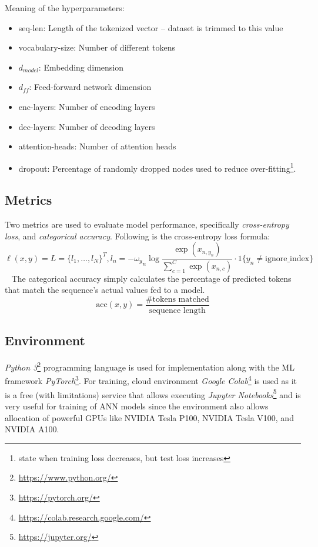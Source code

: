     {\parindent0pt %
Meaning of the hyperparameters:
}
\begin{itemize}
    \item seq-len: Length of the tokenized vector – dataset is trimmed to this value
    \item vocabulary-size: Number of different tokens
    \item $d_{model}$: Embedding dimension
    \item $d_{ff}$: Feed-forward network dimension
    \item enc-layers: Number of encoding layers
    \item dec-layers: Number of decoding layers
    \item attention-heads: Number of attention heads
    \item dropout: Percentage of randomly dropped nodes used to reduce over-fitting\footnote{state when training loss decreases, but test loss increases}.
\end{itemize}

\subsection{Metrics}\label{subsec:metrics}

Two metrics are used to evaluate model performance, specifically \textit{cross-entropy loss}, and \textit{categorical accuracy}.
Following is the cross-entropy loss formula:
\[
    \ell (x, y) = L = \{l_1, \ldots, l_N\}^T, l_n = - {\omega_y}_{n} \log \frac{\exp (x_{n,y_n})}{\sum_{c=1}^{C} \exp (x_{n,c})} \cdot 1 \{y_n \neq \text{ignore\_index}\}
\]~\cite{crossentropyloss}
The categorical accuracy simply calculates the percentage of predicted tokens that match the sequence's actual values fed to a model.
\[
    \text{acc}(x, y) = \frac{\# \text{tokens matched}}{\text{sequence length}}
\]

\subsection{Environment}\label{subsec:environment}

\textit{Python 3}\footnote{\url{https://www.python.org/}} programming language is used for implementation along with the ML framework \textit{PyTorch}\footnote{\url{https://pytorch.org/}}.
For training, cloud environment \textit{Google Colab}\footnote{\url{https://colab.research.google.com/}} is used as it is a free (with limitations) service that allows executing \textit{Jupyter Notebooks}\footnote{\url{https://jupyter.org/}} and is very useful for training of ANN models since the environment also allows allocation of powerful GPUs like NVIDIA Tesla P100, NVIDIA Tesla V100, and NVIDIA A100.


